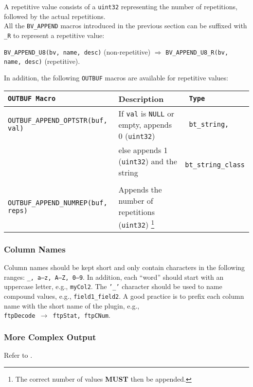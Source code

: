 \documentclass[documentation]{subfiles}
\begin{document}
A repetitive value consists of a {\tt uint32} representing the number of repetitions, followed by the actual repetitions.\\

All the {\tt BV\_APPEND} macros introduced in the previous section can be suffixed with {\tt \_R} to represent a repetitive value:
\begin{center}
    {\tt BV\_APPEND\_U8(bv, name, desc)} (non-repetitive) $\Rightarrow$ {\tt BV\_APPEND\_U8\_R(bv, name, desc)} (repetitive).
\end{center}

In addition, the following {\tt OUTBUF} macros are available for repetitive values:

\begin{longtable}{>{\tt}ll>{\tt}l}
    \toprule
    {\bf {\tt OUTBUF} Macro} & {\bf Description} & {\bf Type}\\
    \midrule
    OUTBUF\_APPEND\_OPTSTR(buf, val)  & If {\tt val} is {\tt NULL} or empty, appends 0 ({\tt uint32}) & bt\_string,\\
                                      & else appends 1 ({\tt uint32}) and the string                  & bt\_string\_class\\\\
    OUTBUF\_APPEND\_NUMREP(buf, reps) & Appends the number of repetitions ({\tt uint32})%
            \footnote{The correct number of values {\bf MUST} then be appended.}                      & \\

    \bottomrule
\end{longtable}

\subsubsection{Column Names}
Column names should be kept short and only contain characters in the following ranges: {\tt \_, a--z, A--Z, 0--9}.
In addition, each ``word'' should start with an uppercase letter, e.g., {\tt myCol2}.
The {\tt '\_'} character should be used to name compound values, e.g., {\tt field1\_field2}.
A good practice is to prefix each column name with the short name of the plugin, e.g.,\\{\tt ftpDecode $\rightarrow$ ftpStat, ftpCNum}.

\subsubsection{More Complex Output}
Refer to .
\end{document}
